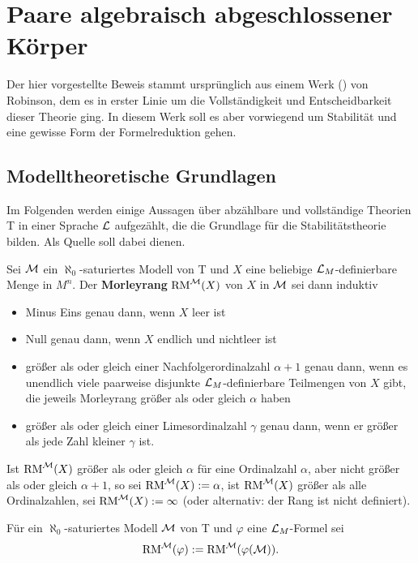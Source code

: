 	\chapter{Paare algebraisch abgeschlossener Körper}
	Der hier vorgestellte Beweis stammt ursprünglich aus einem Werk (\cite{Robinson}) von Robinson, dem es in erster Linie um die Vollständigkeit und Entscheidbarkeit dieser Theorie ging. In diesem Werk soll es aber vorwiegend um Stabilität und eine gewisse Form der Formelreduktion gehen.
	
	\section{Modelltheoretische Grundlagen}
	Im Folgenden werden einige Aussagen über abzählbare und vollständige Theorien T in einer Sprache $\mathcal{L}$ aufgezählt, die die Grundlage für die Stabilitätstheorie bilden. Als Quelle soll dabei \cite{Marker} dienen.
	
	\begin{definition}
		Sei $\mathcal{M}$ ein $\aleph_0$-saturiertes Modell von T und $X$ eine beliebige $\mathcal{L}_M$-definierbare Menge in $M^n$. Der \textbf{Morleyrang} $\operatorname{RM}^{\mathcal{M}}(X)$ von $X$ in $\mathcal{M}$ sei dann induktiv
		\begin{itemize}
			\item Minus Eins genau dann, wenn $X$ leer ist
			\item Null genau dann, wenn $X$ endlich und nichtleer ist
			\item größer als oder gleich einer Nachfolgerordinalzahl $\alpha+1$ genau dann, wenn es unendlich viele paarweise disjunkte $\mathcal{L}_M$-definierbare Teilmengen von $X$ gibt, die jeweils Morleyrang größer als oder gleich $\alpha$ haben
			\item größer als oder gleich einer Limesordinalzahl $\gamma$ genau dann, wenn er größer als jede Zahl kleiner $\gamma$ ist.
		\end{itemize}
	    Ist $\operatorname{RM}^{\mathcal{M}}(X)$ größer als oder gleich $\alpha$ für eine Ordinalzahl $\alpha$, aber nicht größer als oder gleich $\alpha+1$, so sei $\operatorname{RM}^{\mathcal{M}}(X):=\alpha$, ist $\operatorname{RM}^{\mathcal{M}}(X)$ größer als alle Ordinalzahlen, sei $\operatorname{RM}^{\mathcal{M}}(X):=\infty$ (oder alternativ: der Rang ist nicht definiert).
	\end{definition}
	
	\begin{definition}
		Für ein $\aleph_0$-saturiertes Modell $\mathcal{M}$ von T und $\varphi$ eine $\mathcal{L}_M$-Formel sei $$\operatorname{RM}^{\mathcal{M}}(\varphi):=\operatorname{RM}^{\mathcal{M}}(\varphi(\mathcal{M})).$$
	\end{definition}
	
